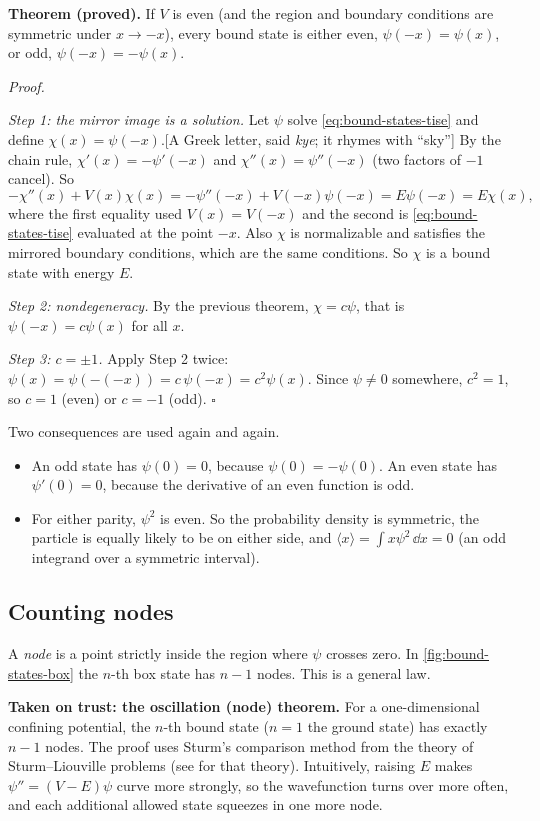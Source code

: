 \textbf{Theorem (proved).} If $V$ is even (and the region and boundary conditions are symmetric under $x\to-x$), every bound state is either even, $\psi(-x)=\psi(x)$, or odd, $\psi(-x)=-\psi(x)$.

\emph{Proof.}

\emph{Step 1: the mirror image is a solution.} Let $\psi$ solve \cref{eq:bound-states-tise} and define $\chi(x)=\psi(-x)$.[A Greek letter, said \emph{kye}; it rhymes with ``sky''] By the chain rule, $\chi'(x)=-\psi'(-x)$ and $\chi''(x)=\psi''(-x)$ (two factors of $-1$ cancel). So
\[
-\chi''(x)+V(x)\chi(x)=-\psi''(-x)+V(-x)\psi(-x)=E\psi(-x)=E\chi(x),
\]
where the first equality used $V(x)=V(-x)$ and the second is \cref{eq:bound-states-tise} evaluated at the point $-x$. Also $\chi$ is normalizable and satisfies the mirrored boundary conditions, which are the same conditions. So $\chi$ is a bound state with energy $E$.

\emph{Step 2: nondegeneracy.} By the previous theorem, $\chi=c\psi$, that is $\psi(-x)=c\psi(x)$ for all $x$.

\emph{Step 3: $c=\pm1$.} Apply Step 2 twice: $\psi(x)=\psi(-(-x))=c\,\psi(-x)=c^2\psi(x)$. Since $\psi\ne0$ somewhere, $c^2=1$, so $c=1$ (even) or $c=-1$ (odd). $\square$

Two consequences are used again and again.
\begin{itemize}
\item An odd state has $\psi(0)=0$, because $\psi(0)=-\psi(0)$. An even state has $\psi'(0)=0$, because the derivative of an even function is odd.
\item For either parity, $\psi^2$ is even. So the probability density is symmetric, the particle is equally likely to be on either side, and $\langle x\rangle=\int x\psi^2\,\dd x=0$ (an odd integrand over a symmetric interval).
\end{itemize}

\subsection{Counting nodes}

A \emph{node} is a point strictly inside the region where $\psi$ crosses zero. In \cref{fig:bound-states-box} the $n$-th box state has $n-1$ nodes. This is a general law.

\begin{beyond}
\textbf{Taken on trust: the oscillation (node) theorem.} For a one-dimensional confining potential, the $n$-th bound state ($n=1$ the ground state) has exactly $n-1$ nodes. The proof uses Sturm's comparison method from the theory of Sturm--Liouville problems (see \cite{rhb} for that theory). Intuitively, raising $E$ makes $\psi''=(V-E)\psi$ curve more strongly, so the wavefunction turns over more often, and each additional allowed state squeezes in one more node.
\end{beyond}

